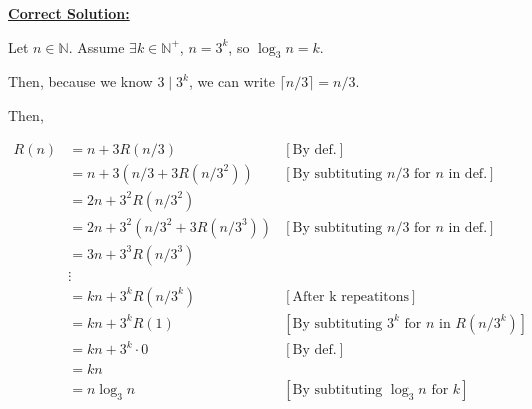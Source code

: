 \documentclass[12pt]{article}
\begin{document}
\begin{mdframed}
    \underline{\textbf{Correct Solution:}}

    \bigskip

    Let $n \in \mathbb{N}$. Assume $\exists k \in \mathbb{N}^+$, $n = 3^k$, so
    $\log_3 n = k$.

    \bigskip

    Then, because we know $3 \mid 3^k$, we can write $\lceil n/3 \rceil = n/3$.

    \bigskip

    Then,

    \color{red}
    \begin{align}
        R(n) &= n + 3R(n/3) & [\text{By def.}]\\
        &= n + 3(n/3 +3R(n/3^2)) & [\text{By subtituting $n/3$ for $n$ in def.}]\\
        &= 2n + 3^2R(n/3^2)\\
        &= 2n + 3^2(n/3^2 + 3R(n/3^3)) & [\text{By subtituting $n/3$ for $n$ in def.}]\\
        &= 3n + 3^3R(n/3^3)\\
        &\vdots\\
        &= kn + 3^kR(n/3^k) & [\text{After k repeatitons}]\\
        &= kn + 3^kR(1) & [\text{By subtituting $3^k$ for $n$ in $R(n/3^k)$}]\\
        &= kn + 3^k \cdot 0 & [\text{By def.}]\\
        &= kn\\
        &= n\log_3 n & [\text{By subtituting $\log_3 n$ for $k$}]
    \end{align}
    \color{black}

\end{mdframed}
\end{document}
